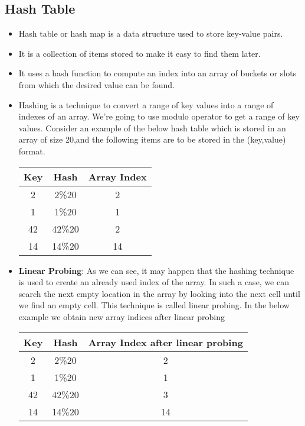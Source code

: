 \documentclass[journal,12pt,twocolumn]{IEEEtran}
\begin{document}
\subsection{\textbf{Hash Table}}
\begin{itemize}
\item Hash table or hash map is a data structure used to store key-value pairs.
\item It is a collection of items stored to make it easy to find them later.
\item It uses a hash function to compute an index into an array of buckets or slots from which the desired value can be found.
\item Hashing is a technique to convert a range of key values into a range of indexes of an array. We're going to use modulo operator to get a range of key values. Consider an example of the below hash table which is stored in an array of size 20,and the following items are to be stored in the (key,value) format.\\
\begin{center}
\begin{tabular}{ |c|c|c| } 
 \hline
Key  & Hash & Array Index \\
\hline
2  & 2\%20 & 2 \\
1  & 1\%20 & 1 \\
42  & 42\%20 & 2 \\
14  & 14\%20 & 14 \\
 \hline
\end{tabular}
\end{center}
\medskip
\item \textbf{Linear Probing}: As we can see, it may happen that the hashing technique is used to create an already used index of the array. In such a case, we can search the next empty location in the array by looking into the next cell until we find an empty cell. This technique is called linear probing.
In the below example we obtain new array indices after linear probing
\begin{center}
\begin{tabular}{ |c|c|c| } 
 \hline
Key  & Hash & Array Index after linear probing\\
\hline
2  & 2\%20 & 2 \\
1  & 1\%20 & 1 \\
42  & 42\%20 & 3 \\
14  & 14\%20 & 14 \\
 \hline
\end{tabular}
\end{center}
\end{itemize}
\end{document}
